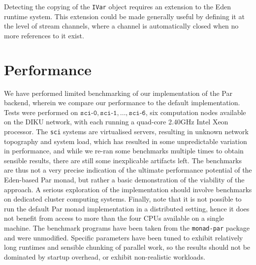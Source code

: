 \documentclass[a4paper, oneside, final]{memoir}
\begin{document}
Detecting the copying of the \texttt{IVar} object requires an
extension to the Eden runtime system.  This extension could be made
generally useful by defining it at the level of stream channels, where
a channel is automatically closed when no more references to it exist.

\section{Performance}

We have performed limited benchmarking of our implementation of the
Par backend, wherein we compare our performance to the default
implementation.  Tests were performed on
$\texttt{sci-0},\texttt{sci-1},\ldots,\texttt{sci-6}$, six computation
nodes available on the DIKU network, with each running a quad-core
2.40GHz Intel Xeon processor.  The \texttt{sci} systems are
virtualised servers, resulting in unknown network topography and
system load, which has resulted in some unpredictable variation in
performance, and while we re-ran some benchmarks multiple times to
obtain sensible results, there are still some inexplicable artifacts
left.  The benchmarks are thus not a very precise indication of the
ultimate performance potential of the Eden-based Par monad, but rather
a basic demonstration of the viability of the approach.  A serious
exploration of the implementation should involve benchmarks on
dedicated cluster computing systems.  Finally, note that it is not
possible to run the default Par monad implementation in a distributed
setting, hence it does not benefit from access to more than the four
CPUs available on a single machine.  The benchmark programs have been
taken from the \texttt{monad-par} package and were unmodified.
Specific parameters have been tuned to exhibit relatively long
runtimes and sensible chunking of parallel work, so the results should
not be dominated by startup overhead, or exhibit non-realistic
workloads.
\end{document}
